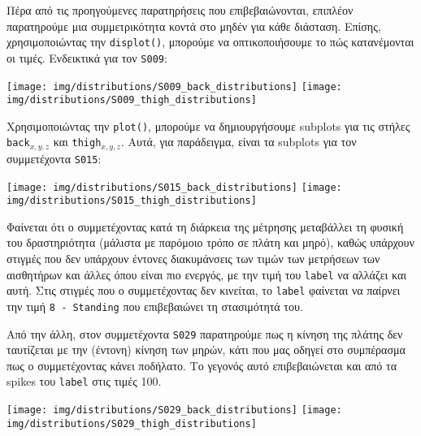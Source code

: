         Πέρα από τις προηγούμενες παρατηρήσεις που επιβεβαιώνονται, επιπλέον παρατηρούμε μια συμμετρικότητα κοντά στο μηδέν
        για κάθε διάσταση. Επίσης, χρησιμοποιώντας την \texttt{displot()}, μπορούμε να οπτικοποιήσουμε το πώς κατανέμονται οι τιμές.
        Ενδεικτικά για τον \texttt{S009}:

        \begin{multicols}{2} \centering
            \texttt{[image: img/distributions/S009\_back\_distributions]}
            \texttt{[image: img/distributions/S009\_thigh\_distributions]}
        \end{multicols}

        Χρησιμοποιώντας την \texttt{plot()}, μπορούμε να δημιουργήσουμε subplots για τις στήλες \texttt{back}\(_{x,y,z}\)
        και \texttt{thigh}\(_{x,y,z}\). Αυτά, για παράδειγμα, είναι τα subplots για τον συμμετέχοντα \texttt{S015}:

        \begin{multicols}{2} \centering
            \noindent\texttt{[image: img/distributions/S015\_back\_distributions]}
            \texttt{[image: img/distributions/S015\_thigh\_distributions]}
        \end{multicols}

        Φαίνεται ότι ο συμμετέχοντας κατά τη διάρκεια της μέτρησης μεταβάλλει τη φυσική του δραστηριότητα (μάλιστα με παρόμοιο τρόπο σε πλάτη και μηρό),
        καθώς υπάρχουν στιγμές που δεν υπάρχουν έντονες διακυμάνσεις των τιμών των μετρήσεων των αισθητήρων και άλλες όπου είναι πιο ενεργός,
        με την τιμή του \texttt{label} να αλλάζει και αυτή. Στις στιγμές που ο συμμετέχοντας δεν κινείται, το \texttt{label}
        φαίνεται να παίρνει την τιμή \texttt{8 - Standing} που επιβεβαιώνει τη στασιμότητά του.

        Από την άλλη, στον συμμετέχοντα \texttt{S029} παρατηρούμε πως η κίνηση της πλάτης δεν ταυτίζεται με την (έντονη) κίνηση των μηρών,
        κάτι που μας οδηγεί στο συμπέρασμα πως ο συμμετέχοντας κάνει ποδήλατο.
        Το γεγονός αυτό επιβεβαιώνεται και από τα spikes του \texttt{label} στις τιμές 100.
        \pagebreak

        \begin{multicols}{2} \centering
            \noindent\texttt{[image: img/distributions/S029\_back\_distributions]}
            \texttt{[image: img/distributions/S029\_thigh\_distributions]}
        \end{multicols}

